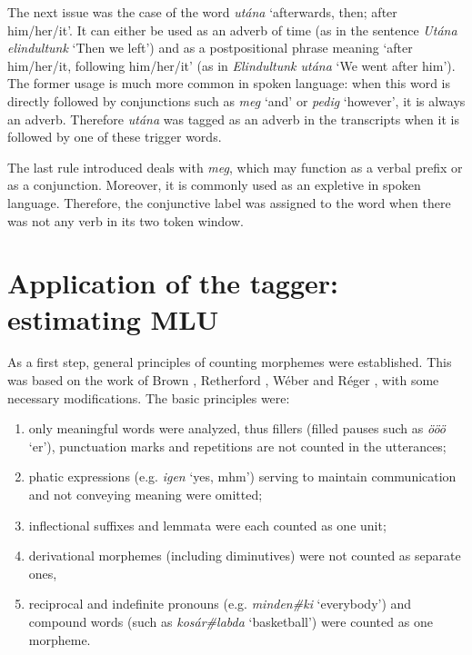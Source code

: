 The next issue was the case of the word \textit{utána} `afterwards, then; after him/her/it’. It can either be used as an adverb of time (as in the sentence \textit{Utána elindultunk} `Then we left’) and as a postpositional phrase meaning `after him/her/it, following him/her/it’ (as in \textit{Elindultunk utána} `We went after him’). The former usage is much more common in spoken language: when this word is directly followed by conjunctions such as \textit{meg} `and’ or \textit{pedig} `however’, it is always an adverb. Therefore \textit{utána} was tagged as an adverb in the transcripts when it is followed by one of these trigger words. 

The last rule introduced deals with \textit{meg}, which may function as a verbal prefix or as a conjunction.  
Moreover, it is commonly used as an expletive in spoken language. Therefore, the conjunctive label was assigned to the word when there was not any verb in its two token window.

\section{Application of the tagger: estimating MLU}

As a first step, general principles of counting morphemes were established. 
This  was based on the work of Brown \cite{Brown1973}, Retherford \cite{retherford1993guide}, Wéber \cite{Weber2011} and Réger \cite{Reger1990}, with some necessary modifications. 
The basic principles were: 
\begin{enumerate}
 \item only meaningful words were analyzed, thus fillers (filled pauses such as \textit{ööö} `er’), punctuation marks and repetitions are not counted in the utterances;
 \item phatic expressions (e.g. \textit{igen} `yes, mhm’) serving to maintain communication and not conveying meaning were omitted;
 \item inflectional suffixes and lemmata were each counted as one unit; 
 \item derivational morphemes (including diminutives) were not counted as separate ones,
 \item reciprocal and indefinite pronouns (e.g. \textit{minden\#ki} `everybody’) and compound words (such as \textit{kosár\#labda} `basketball’) were counted as one morpheme.
 \end{enumerate}

